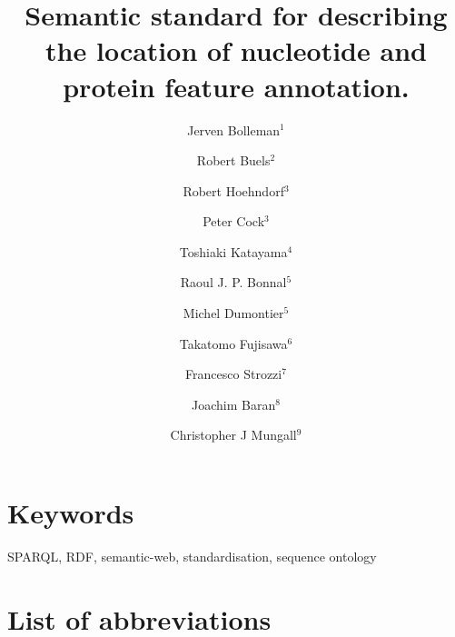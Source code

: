 \documentclass[10pt]{bmc_article}
\newenvironment{bmcformat}{\begin{raggedright}\baselineskip20pt\sloppy\setboolean{publ}{false}}{\end{raggedright}\baselineskip20pt\sloppy}
\begin{document}
\begin{bmcformat}
\title{Semantic standard for describing the location of nucleotide and protein feature annotation.}
\author{Jerven Bolleman\correspondingauthor$^1$%
    \and Robert Buels$^2$%
    \and Robert Hoehndorf$^3$%
    \and Peter Cock$^3$%
    \and Toshiaki Katayama$^4$%
    \and Raoul J. P. Bonnal$^5$%
    \and Michel Dumontier$^5$%
    \and Takatomo Fujisawa$^6$%
    \and Francesco Strozzi$^7$%
    \and Joachim Baran$^8$%
    \and Christopher J Mungall$^9$%
}
\address{
 \iid(1) SIB Swiss Institute of Bioinformatics, Centre Medical Universitaire, 1 rue Michel
Servet, 1211 Geneva 4, Switzerland,
 \iid(2) University of California, Berkeley, Berkeley, CA, USA,
 \iid(3) The James Hutton Institute, Dundee, DD2 5DA, UK,
 \iid(4) Database Center for Life Science, Research Organization of Information and Systems, 2-11-16, Yayoi, Bunkyo-ku, Tokyo, 113-0032, Japan,
 \iid(5) Integrative Biology Program, Istituto Nazionale Genetica Molecolare, Milan, Italy,
 \iid(6) Center for Information Biology, National Institute of Genetics, Research Organization of Information and Systems, 1111 Yata, Mishima, Shizuoka 411-08540, Japan,
 \iid(7) CeRSA, Parco Tecnologico Padano, Lodi 26900, Italy, and
 \iid(8) Ontario Institute for Cancer Research, 101 College Street, Suite 800, Toronto, Ontario, M5G 0A3, Canada.
 \iid(9) Genomics Division, Lawrence Berkeley National Laboratory, Berkeley, CA, 94720, US
}
\maketitle


\section*{Keywords}
SPARQL, RDF, semantic-web, standardisation, sequence ontology









\section*{List of abbreviations}


\end{bmcformat}
\end{document}
